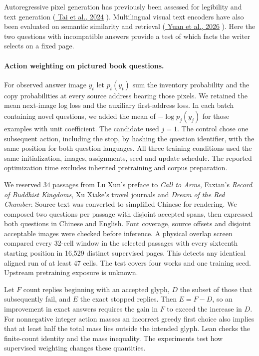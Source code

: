 \documentclass[12pt,a4paper]{article}
\providecommand{\DIFadd}[1]{{\protect\color{blue} \sf #1}} %
\begin{document}
\DIFadd{Autoregressive pixel generation has previously been assessed for legibility and text generation (}\href{https://aclanthology.org/2024.findings-acl.874/}{\DIFadd{Tai et al., 2024}}\DIFadd{). Multilingual visual text encoders have also been evaluated on semantic similarity and retrieval (}\href{https://aclanthology.org/2026.emnlp-main.2412/}{\DIFadd{Yuan et al., 2026}}\DIFadd{). Here the two questions with incompatible answers provide a test of which facts the writer selects on a fixed page.
}

\paragraph{\DIFadd{Action weighting on pictured book questions.}}
\DIFadd{For observed answer image $y_t$ let $p_t(y_t)$ sum the inventory probability and the copy probabilities at every source address bearing those pixels. We retained the mean next-image log loss and the auxiliary first-address loss. In each batch containing novel questions, we added the mean of $-\log p_j(y_j)$ for those examples with unit coefficient. The candidate used $j=1$. The control chose one subsequent action, including the stop, by hashing the question identifier, with the same position for both question languages. All three training conditions used the same initialization, images, assignments, seed and update schedule. The reported optimization time excludes inherited pretraining and corpus preparation.
}

\DIFadd{We reserved 34 passages from Lu Xun's preface to \emph{Call to Arms}, Faxian's \emph{Record of Buddhist Kingdoms}, Xu Xiake's travel journals and \emph{Dream of the Red Chamber}. Source text was converted to simplified Chinese for rendering. We composed two questions per passage with disjoint accepted spans, then expressed both questions in Chinese and English. Font coverage, source offsets and disjoint acceptable images were checked before inference. A physical overlap screen compared every 32-cell window in the selected passages with every sixteenth starting position in 16,529 distinct supervised pages. This detects any identical aligned run of at least 47 cells. The test covers four works and one training seed. Upstream pretraining exposure is unknown.
}

\DIFadd{Let $F$ count replies beginning with an accepted glyph, $D$ the subset of those that subsequently fail, and $E$ the exact stopped replies. Then $E=F-D$, so an improvement in exact answers requires the gain in $F$ to exceed the increase in $D$. For nonnegative integer action masses an incorrect greedy first choice also implies that at least half the total mass lies outside the intended glyph. Lean checks the finite-count identity and the mass inequality. The experiments test how supervised weighting changes these quantities.
}
\end{document}

